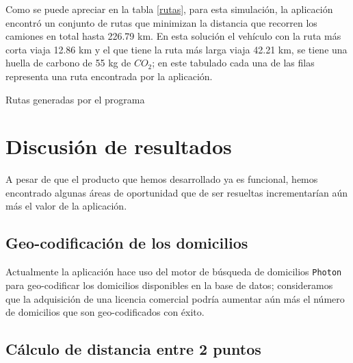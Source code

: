 \documentclass[journal]{IEEEtran}
\begin{document}
            Como se puede apreciar en la tabla \ref{rutas}, para esta simulación, la aplicación encontró un conjunto de rutas que minimizan la distancia que recorren los camiones en total hasta 226.79 km. En esta solución el vehículo con la ruta más corta viaja 12.86 km y el que tiene la ruta más larga viaja 42.21 km, se tiene una huella de carbono de 55 kg de $CO_2$; en este tabulado cada una de las filas representa una ruta encontrada por la aplicación.
            
            \begin{table}[h!]
                \centering
                \caption{Rutas generadas por el programa}
                \label{rutas}
            \end{table}
            
    \section{Discusión de resultados} \label{sec:discusion}
        
        A pesar de que el producto que hemos desarrollado ya es funcional, hemos encontrado algunas áreas de oportunidad que de ser resueltas incrementarían aún más el valor de la aplicación.
        
        \subsection{Geo-codificación de los domicilios}
            
            Actualmente la aplicación hace uso del motor de búsqueda de domicilios \texttt{Photon} \cite{photon} para geo-codificar los domicilios disponibles en la base de datos; consideramos que la adquisición de una licencia comercial podría aumentar aún más el número de domicilios que son geo-codificados con éxito.
            
        \subsection{Cálculo de distancia entre 2 puntos}
            
\end{document}
